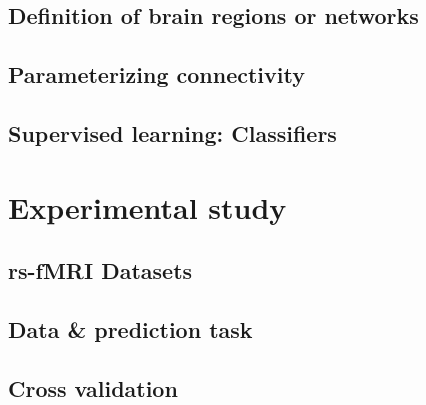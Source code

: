 \documentclass[5p]{elsarticle}
\begin{document}
\subsection{Definition of brain regions or networks}

\subsection{Parameterizing connectivity}

\subsection{Supervised learning: Classifiers}

\section{Experimental study}

\subsection{rs-fMRI Datasets}

\subsection{Data \& prediction task}
\subsection{Cross validation}


\end{document}
